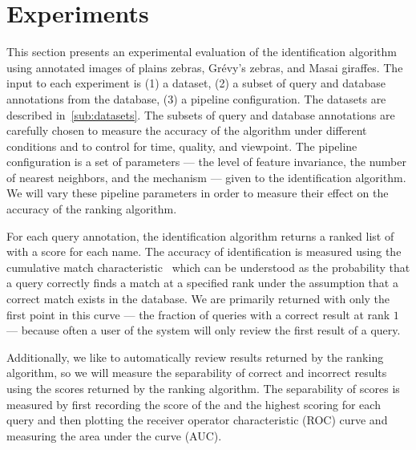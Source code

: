 
\section{Experiments}\label{sec:experiments}

    This section presents an experimental evaluation of the identification algorithm using annotated images of
      plains zebras, Grévy's zebras, and Masai giraffes.
    The input to each experiment is
    (1) a dataset,
    (2) a subset of query and database annotations from the database,
    (3) a pipeline configuration.
    The datasets are described in~\cref{sub:datasets}.
    The subsets of query and database annotations are carefully chosen to measure the accuracy of the algorithm
      under different conditions and to control for time, quality, and viewpoint.
    The pipeline configuration is a set of parameters --- \eg{} the level of feature invariance, the number of
      nearest neighbors, and the \namescoring{} mechanism --- given to the identification algorithm.
    We will vary these pipeline parameters in order to measure their effect on the accuracy of the ranking
      algorithm.

    For each query annotation, the identification algorithm returns a ranked list of \names{} with a score for
      each name.
    The accuracy of identification is measured using the cumulative match
      characteristic~\cite{decann_relating_2013} which can be understood as the probability that a query correctly
      finds a match at a specified rank under the assumption that a correct match exists in the database.
    We are primarily returned with only the first point in this curve --- the fraction of queries with a correct
      result at rank $1$ --- because often a user of the system will only review the first result of a query.

    Additionally, we like to automatically review results returned by the ranking algorithm, so we will measure
      the separability of correct and incorrect results using the scores returned by the ranking algorithm.
    The separability of scores is measured by first recording the score of the \groundtrue{} \name{} and the
      highest scoring \groundfalse{} \name{} for each query and then plotting the receiver operator characteristic
      (ROC) curve and measuring the area under the curve (AUC).

